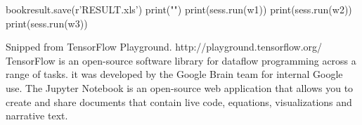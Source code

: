 \documentclass{article}
\begin{document}
\begin{spacing}{2}
\begin{python}
    bookresult.save(r'RESULT.xls')
    print("\n")
    print(sess.run(w1))
    print(sess.run(w2))
    print(sess.run(w3))

\end{python}
   

    
    
    \begin{thebibliography}{10}
    Snipped from TensorFlow Playground. http://playground.tensorflow.org/
    TensorFlow is an open-source software library for dataflow programming across a range of tasks. it was developed by the Google Brain team for internal Google use. 
    The Jupyter Notebook is an open-source web application that allows you to create and share documents that contain live code, equations, visualizations and narrative text.

    \end{thebibliography}

    \end{spacing}
    
\end{document}
